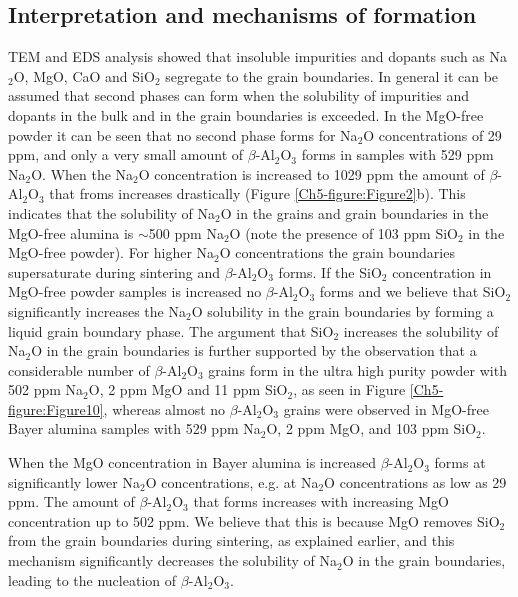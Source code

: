 \subsection{Interpretation and mechanisms of formation}

TEM and EDS analysis showed that insoluble impurities and dopants such as Na$_{2}$O, MgO, CaO and SiO$_{2}$ segregate to the grain boundaries. In general it can be assumed that second phases can form when the solubility of impurities and dopants in the bulk and in the grain boundaries is exceeded. In the MgO-free powder it can be seen that no second phase forms for Na$_{2}$O concentrations of 29 ppm, and only a very small amount of $\beta$-Al$_{2}$O$_{3}$ forms in samples with 529 ppm Na$_{2}$O. When the Na$_{2}$O concentration is increased to 1029 ppm the amount of $\beta$-Al$_{2}$O$_{3}$ that froms increases drastically (Figure \ref{Ch5-figure:Figure2}b). This indicates that the solubility of Na$_{2}$O in the grains and grain boundaries in the MgO-free alumina is $\sim$500 ppm Na$_{2}$O (note the presence of 103 ppm SiO$_{2}$ in the MgO-free powder). For higher Na$_{2}$O concentrations the grain boundaries supersaturate during sintering and $\beta$-Al$_{2}$O$_{3}$ forms. If the SiO$_{2}$ concentration in MgO-free powder samples is increased no $\beta$-Al$_{2}$O$_{3}$ forms and we believe that SiO$_{2}$ significantly increases the Na$_{2}$O solubility in the grain boundaries by forming a liquid grain boundary phase. The argument that SiO$_{2}$ increases the solubility of Na$_{2}$O in the grain boundaries is further supported by the observation that a considerable number of $\beta$-Al$_{2}$O$_{3}$ grains form in the ultra high purity powder with 502 ppm Na$_{2}$O, 2 ppm MgO and 11 ppm SiO$_{2}$, as seen in Figure \ref{Ch5-figure:Figure10}, whereas almost no $\beta$-Al$_{2}$O$_{3}$ grains were observed in MgO-free Bayer alumina samples with 529 ppm Na$_{2}$O, 2 ppm MgO, and 103 ppm SiO$_{2}$. 

When the MgO concentration in Bayer alumina is increased $\beta$-Al$_{2}$O$_{3}$ forms at significantly lower Na$_{2}$O concentrations, e.g. at Na$_{2}$O concentrations as low as 29 ppm. The amount of $\beta$-Al$_{2}$O$_{3}$ that forms increases with increasing MgO concentration up to 502 ppm. We believe that this is because MgO removes SiO$_{2}$ from the grain boundaries during sintering, as explained earlier, and this mechanism significantly decreases the solubility of Na$_{2}$O in the grain boundaries, leading to the nucleation of $\beta$-Al$_{2}$O$_{3}$. 

